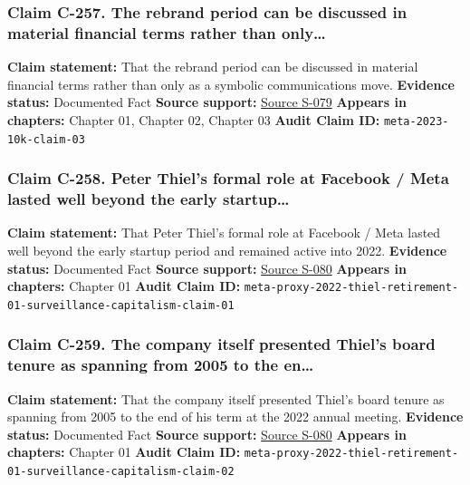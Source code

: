 \documentclass[
  american,
  11pt,
  letterpaper,
]{article}
\begin{document}
\subsubsection{Claim C-257. The rebrand period can be discussed in
material financial terms rather than
only\ldots{}}\label{claim-c-257-the-rebrand-period-can-be-discussed-in-material-financial-terms-rather-than-only}

\textbf{Claim statement:} That the rebrand period can be discussed in
material financial terms rather than only as a symbolic communications
move. \textbf{Evidence status:} Documented Fact \textbf{Source support:}
\hyperref[source-s-079-meta-platforms-inc-2023-annual-report-form-10-k]{Source
S-079} \textbf{Appears in chapters:} Chapter 01, Chapter 02, Chapter 03
\textbf{Audit Claim ID:} \texttt{meta-2023-10k-claim-03}

\subsubsection{Claim C-258. Peter Thiel's formal role at Facebook / Meta
lasted well beyond the early
startup\ldots{}}\label{claim-c-258-peter-thiel-s-formal-role-at-facebook-meta-lasted-well-beyond-the-early-startup}

\textbf{Claim statement:} That Peter Thiel's formal role at Facebook /
Meta lasted well beyond the early startup period and remained active
into 2022. \textbf{Evidence status:} Documented Fact \textbf{Source
support:}
\hyperref[source-s-080-meta-platforms-inc-2022-definitive-proxy-statement]{Source
S-080} \textbf{Appears in chapters:} Chapter 01 \textbf{Audit Claim ID:}
\texttt{meta-proxy-2022-thiel-retirement-01-surveillance-capitalism-claim-01}

\subsubsection{Claim C-259. The company itself presented Thiel's board
tenure as spanning from 2005 to the
en\ldots{}}\label{claim-c-259-the-company-itself-presented-thiel-s-board-tenure-as-spanning-from-2005-to-the-en}

\textbf{Claim statement:} That the company itself presented Thiel's
board tenure as spanning from 2005 to the end of his term at the 2022
annual meeting. \textbf{Evidence status:} Documented Fact \textbf{Source
support:}
\hyperref[source-s-080-meta-platforms-inc-2022-definitive-proxy-statement]{Source
S-080} \textbf{Appears in chapters:} Chapter 01 \textbf{Audit Claim ID:}
\texttt{meta-proxy-2022-thiel-retirement-01-surveillance-capitalism-claim-02}
\end{document}
